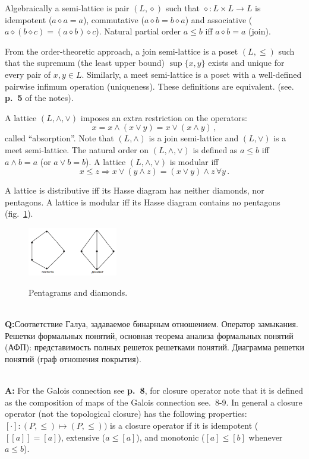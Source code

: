 \documentclass[a4paper,14pt]{extarticle}
\newcommand{\rus}[1]{\foreignlanguage{russian}{#1}}
\begin{document}
Algebraically a semi-lattice is pair $(L, \diamond)$ such that $\diamond: L\times L \to L$
is idempotent ($a\diamond a=a$), commutative ($a \diamond b = b \diamond a$) and associative
($a \diamond (b \diamond c) = (a \diamond b) \diamond c$). Natural partial order $a\leq b$
iff $a\diamond b = a$ (join).

From the order-theoretic approach, a join semi-lattice is a poset $(L, \leq)$ such
that the supremum (the least upper bound) $\sup\{x, y\}$ exists and unique for every
pair of $x, y \in L$. Similarly, a meet semi-lattice is a poset with a well-defined
pairwise infimum operation (uniqueness). These definitions are equivalent. (see.
\textbf{p.~5} of the notes).

A lattice $(L, \wedge, \vee)$ imposes an extra restriction on the operators:
$$ x = x \wedge (x\vee y) = x \vee ( x\wedge y) \,, $$
called ``absorption''. Note that $(L, \wedge)$ is a join semi-lattice and $(L, \vee)$
is a meet semi-lattice. The natural order on $(L, \wedge, \vee)$ is defined as
$a\leq b$ iff $a\wedge b=a$ (or $a\vee b = b$). A lattice $(L, \wedge, \vee)$ is
modular iff
$$ x\leq z \Rightarrow x \vee (y\wedge z) = (x \vee y ) \wedge z\, \forall y\,. $$

A lattice is distributive iff its Hasse diagram has neither diamonds, nor pentagons.
A lattice is modular iff its Hasse diagram contains no pentagons (fig.~\ref{fig:lattice_pen_di}).
\begin{figure}
    \centering
    \includegraphics[width=0.35\textwidth]{pents_and_diamonds.png}
    \label{fig:lattice_pen_di}
    \caption{Pentagrams and diamonds.}
\end{figure}

\hfill\\\noindent\textbf{Q:}\rus{Соответствие Галуа, задаваемое бинарным отношением. Оператор
замыкания. Решетки формальных понятий, основная теорема анализа формальных понятий
(АФП): представимость полных решеток решетками понятий. Диаграмма решетки понятий
(граф отношения покрытия).}

\hfill\\\noindent\textbf{A:}
For the Galois connection see \textbf{p.~8}, for closure operator note that it is
defined as the composition of maps of the Galois connection see.~8-9. In general
a closure  operator (not the topological closure) has the following properties:
$[\cdot]: (P, \leq) \mapsto (P, \leq))$ is a closure operator if it is idempotent
($[[a]]=[a]$), extensive ($a\leq [a]$), and monotonic ($[a]\leq [b]$ whenever
$a\leq b$).
\end{document}
